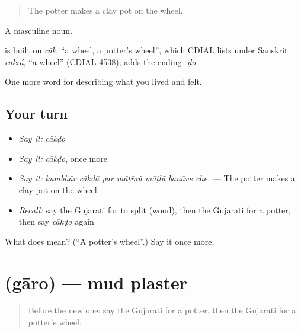 \begin{quote}
The potter makes a clay pot on the wheel.
\end{quote}

A masculine noun.

\begin{cousinweb}
is built on \emph{cāk}, \textquotedblleft{}a wheel, a potter's wheel\textquotedblright{}, which CDIAL lists under Sanskrit \emph{cakrá}, \textquotedblleft{}a wheel\textquotedblright{} (CDIAL 4538); \textbf{} adds the ending \emph{-ḍo}.
\end{cousinweb}

\begin{grammarlens}[title={What you've built}]
One more word for describing what you lived and felt.
\end{grammarlens}

\subsection*{Your turn}
\begin{itemize}
\raggedright
  \item \emph{Say it:} \emph{cākḍo}
  \item \emph{Say it:} \emph{cākḍo}, once more
  \item \emph{Say it:} \emph{kumbhār cākḍā par māṭīnũ māṭlũ banāve che.} — The potter makes a clay pot on the wheel.
  \item \emph{Recall:} say the Gujarati for to split (wood), then the Gujarati for a potter, then say \emph{cākḍo} again
\end{itemize}

\begin{tcolorbox}[breakable,colback=teal!4,colframe=teal!35!black,title={Before you move on}]
What does  mean? (\textquotedblleft{}A potter's wheel\textquotedblright{}.) Say it once more.
\end{tcolorbox}
\section[\texorpdfstring{\gu{ગારો} (gāro)}{ગારો (gāro)}]{ (gāro) — mud plaster}

\label{lesson:GU-C504-garo}



\begin{quote}
Before the new one: say the Gujarati for a potter, then the Gujarati for a potter's wheel.
\end{quote}

